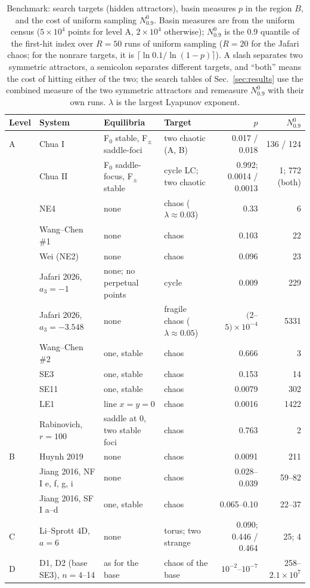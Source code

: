 \begin{table}
\caption{Benchmark: search targets (hidden attractors), basin measures $p$ in the region $B$, and the cost of uniform sampling $N^0_{0.9}$. Basin measures are from the uniform census ($5\times10^4$ points for level A, $2\times10^4$ otherwise); $N^0_{0.9}$ is the 0.9 quantile of the first-hit index over $R=50$ runs of uniform sampling ($R=20$ for the Jafari chaos; for the nonrare targets, it is $\lceil\ln0.1/\ln(1-p)\rceil$). A slash separates two symmetric attractors, a semicolon separates different targets, and ``both'' means the cost of hitting either of the two; the search tables of Sec.~\ref{sec:results} use the combined measure of the two symmetric attractors and remeasure $N^0_{0.9}$ with their own runs. $\lambda$ is the largest Lyapunov exponent.}
\label{tab:benchmark}
\footnotesize
\setlength{\tabcolsep}{4pt}
\begin{ruledtabular}
\begin{tabular}{llllrr}
Level & System & Equilibria & Target & $p$ & $N^0_{0.9}$ \\
\hline
A & Chua I & F$_0$ stable, F$_\pm$ saddle-foci & two chaotic (A, B) & 0.017 / 0.018 & 136 / 124 \\
 & Chua II & F$_0$ saddle-focus, F$_\pm$ stable & cycle LC; two chaotic & 0.992; 0.0014 / 0.0013 & 1; 772 (both) \\
 & NE4 & none & chaos ($\lambda\approx0.03$) & 0.33 & 6 \\
 & Wang--Chen \#1 & none & chaos & 0.103 & 22 \\
 & Wei (NE2) & none & chaos & 0.096 & 23 \\
 & Jafari 2026, $a_3=-1$ & none; no perpetual points & cycle & 0.009 & 229 \\
 & Jafari 2026, $a_3=-3.548$ & none & fragile chaos ($\lambda\approx0.05$) & $(2$--$5)\times10^{-4}$ & 5331 \\
 & Wang--Chen \#2 & one, stable & chaos & 0.666 & 3 \\
 & SE3 & one, stable & chaos & 0.153 & 14 \\
 & SE11 & one, stable & chaos & 0.0079 & 302 \\
 & LE1 & line $x=y=0$ & chaos & 0.0016 & 1422 \\
 & Rabinovich, $r=100$ & saddle at 0, two stable foci & chaos & 0.763 & 2 \\
\hline
B & Huynh 2019 & none & chaos & 0.0091 & 211 \\
 & Jiang 2016, NF I e, f, g, i & none & chaos & 0.028--0.039 & 59--82 \\
 & Jiang 2016, SF I a--d & one, stable & chaos & 0.065--0.10 & 22--37 \\
\hline
C & Li--Sprott 4D, $a=6$ & none & torus; two strange & 0.090; 0.446 / 0.464 & 25; 4 \\
\hline
D & D1, D2 (base SE3), $n=4$--14 & as for the base & chaos of the base & $10^{-2}$--$10^{-7}$ & 258--$2.1\times10^{7}$ \\
\end{tabular}
\end{ruledtabular}
\end{table}

